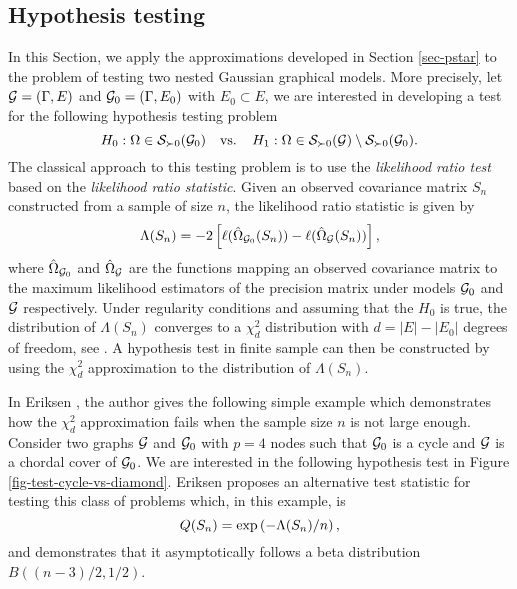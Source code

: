 \subsection{Hypothesis testing} \label{sec-hyp-test}


In this Section, we apply the approximations developed in Section \ref{sec-pstar} to the problem of testing two nested Gaussian graphical models. More precisely, let ${\mathcal{G}} = (\Gamma, E)$ and ${\mathcal{G}}_0 = (\Gamma, E_0)$ with $E_0 \subset E$, we are interested in developing a test for the following hypothesis testing problem
\begin{equation} \label{eq-null-general-graph}
    H_0 : \Omega \in {\mathcal{S}}_{\succ 0}({\mathcal{G}}_0)\ \ {\textrm{ vs. }}\ \ H_1 : \Omega \in {\mathcal{S}}_{\succ 0}({\mathcal{G}}) \setminus {\mathcal{S}}_{\succ 0}({\mathcal{G}}_0).
\end{equation}
The classical approach to this testing  problem is to use the \textit{likelihood ratio test} based on the \textit{likelihood ratio statistic}. Given an observed covariance matrix $S_n$ constructed from a sample of size $n$, the likelihood ratio statistic is given by
\begin{equation*}
    \Lambda(S_n) = -2 \left[\ell(\hat\Omega_{{\mathcal{G}}_0}(S_n)) - \ell(\hat\Omega_{\mathcal{G}}(S_n))\right],
\end{equation*}
where $\hat\Omega_{{\mathcal{G}}_0}$ and $\hat\Omega_{\mathcal{G}}$ are the functions mapping an observed covariance matrix to the maximum likelihood estimators of the precision matrix under models ${\mathcal{G}}_0$ and ${\mathcal{G}}$ respectively. Under regularity conditions and assuming that the $H_0$ is true, the distribution of $\Lambda(S_n)$ converges to a $\chi^2_d$ distribution with $d = |E| - |E_0|$ degrees of freedom, see \cite{wilks1938large}. A hypothesis test in finite sample can then be constructed by using the $\chi^2_d$ approximation to the distribution of $\Lambda(S_n)$.

In Eriksen \cite{eriksen1996tests}, the author gives the following simple example which demonstrates how the $\chi^2_d$ approximation fails when the sample size $n$ is not large enough. Consider two graphs ${\mathcal{G}}$ and ${\mathcal{G}}_0$ with $p = 4$ nodes such that ${\mathcal{G}}_0$ is a cycle and ${\mathcal{G}}$ is a chordal cover of ${\mathcal{G}}_0$. We are interested in the following hypothesis test in Figure \ref{fig-test-cycle-vs-diamond}. Eriksen proposes an alternative test statistic for testing this class of problems which, in this example, is
\begin{equation} \label{eq-q-stat}
    Q(S_n) = \exp\left(-\Lambda(S_n) / n\right),
\end{equation}
and demonstrates that it asymptotically follows a beta distribution $B((n - 3)/2, 1/2)$.



